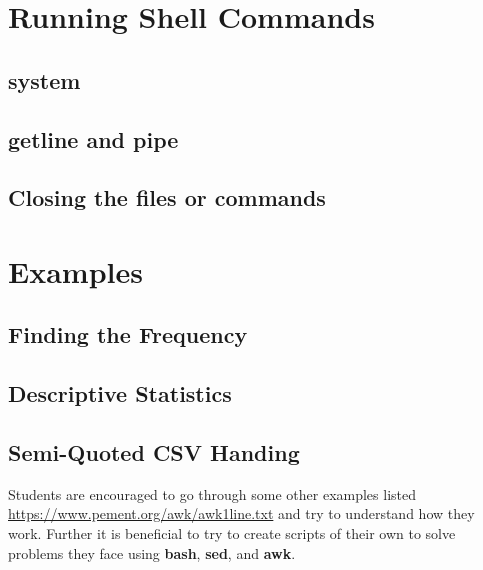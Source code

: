 \section{Running Shell Commands}

\subsection{system}

\subsection{getline and pipe}

\subsection{Closing the files or commands}

\section{Examples}

\subsection{Finding the Frequency}

\subsection{Descriptive Statistics}

\subsection{Semi-Quoted CSV Handing}

Students are encouraged to go through some other examples listed
\href{here}{https://www.pement.org/awk/awk1line.txt} and try to understand how they work. Further it is beneficial to try to create scripts of their own to solve problems they face using \textbf{bash}, \textbf{sed}, and \textbf{awk}.
